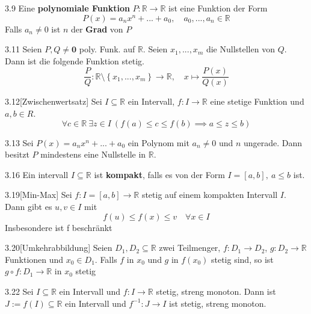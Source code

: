 \documentclass[8pt,a4paper,twocolumn,table]{extarticle}
\newcommand{\R}{\mathbb{R}}
\begin{document}
\begin{definition}{3.9}
    Eine \textbf{polynomiale Funktion} $P: \R \to \R$ ist eine Funktion der Form
    \[ P(x) = a_n x^n + ... + a_0, \quad a_0, ..., a_n \in \R \]
    Falls $a_n \ne 0$ ist $n$ der \textbf{Grad} von $P$
\end{definition}

\begin{korollar}{3.11}
    Seien $P, Q \ne \mathbf{0}$ poly. Funk. auf $\R$. Seien $x_1, ..., x_m$ die Nullstellen von $Q$. Dann ist die folgende Funktion stetig.
    \[ \frac{P}{Q}: \R \setminus \left\{ x_1, ..., x_m \right\} \to \R,\quad x \mapsto \frac{P(x)}{Q(x)} \]
\end{korollar}

\begin{satz}{3.12}[Zwischenwertsatz]
    Sei $I \subseteq \R$ ein Intervall, $f: I \to \R$ eine stetige Funktion und $a, b \in R$.
    \[ \forall c \in \R \ \exists z \in I\ \left( f(a) \le c \le f(b) \implies a \le z \le b \right) \]
\end{satz}

\begin{korollar}{3.13}
    Sei $P(x) = a_nx^n + ... + a_0$ ein Polynom mit $a_n \ne 0$ und $n$ ungerade.
    Dann besitzt $P$ mindestens eine Nullstelle in $\R$.
\end{korollar}

\begin{definition}{3.16}
    Ein intervall $I \subseteq \R$ ist \textbf{kompakt}, falls es von der Form $I = [a, b],\ a \le b$ ist.
\end{definition}

\begin{satz}{3.19}[Min-Max] Sei $f: I = [a,b] \to \R$ stetig auf einem kompakten Intervall $I$.
    Dann gibt es $u,v \in I$ mit
    \[ f(u) \le f(x) \le v \quad \forall x \in I \]
    Insbesondere ist f beschränkt
\end{satz}

\begin{satz}{3.20}[Umkehrabbildung]
    Seien $D_1,D_2 \subseteq \R$ zwei Teilmenger, $f: D_1 \to D_2$, $g: D_2 \to \R$ Funktionen und $x_0 \in D_1$.
    Falls $f$ in $x_0$ und $g$ in $f(x_0)$ stetig sind, so ist $g \circ f: D_1 \to \R$ in $x_0$ stetig
\end{satz}

\begin{satz}{3.22}
    Sei $I \subseteq \R$ ein Intervall und $f: I \to \R$ stetig, streng monoton.
    Dann ist $J := f(I) \subseteq \R$ ein Intervall und $f^{-1}: J \to I$ ist stetig, streng monoton.
\end{satz}
\end{document}
